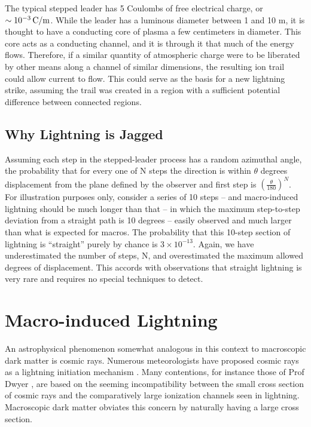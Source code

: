 \documentclass[%
 reprint,
 amsmath,amssymb,
 aps,
]{revtex4-2}
\begin{document}
    The typical stepped leader has 5 Coulombs of free electrical charge, or $\sim10^{-3} \, \rm{C/m}$. While the leader has a luminous diameter between 1 and 10 m, it is thought to have a conducting core of plasma a few centimeters in diameter. This core acts as a conducting channel, and it is through it that much of the energy flows. Therefore, if a similar quantity of atmospheric charge were to be liberated by other means along a channel of similar dimensions, the resulting ion trail could allow current to flow. This could serve as the basis for a new lightning strike, assuming the trail was created in a region with a sufficient potential difference between connected regions.
    
    
    \subsection*{Why Lightning is Jagged} %
    \label{sub:why_lightning_is_jagged}

        Assuming each step in the stepped-leader process has a random azimuthal angle, the probability that for every one of N steps the direction is within $\theta$ degrees displacement from the plane defined by the observer and first step is $\left(\frac{\theta}{180}\right)^{N}$. For illustration purposes only, consider a series of 10 steps  -- and macro-induced lightning should be much longer than that -- in which the maximum step-to-step deviation from a straight path is 10 degrees -- easily observed and much larger than what is expected for macros.
        The probability that this 10-step section of lightning is ``straight'' purely by chance is $3 \times 10^{-13}$. Again, we have underestimated the number of steps, N, and overestimated the maximum allowed degrees of displacement. This accords with observations that straight lightning is very rare and requires no special techniques to detect.
        



\section{Macro-induced \textbf{}Lightning} %
\label{sec:macro_induced_lightning}

    An astrophysical phenomenon somewhat analogous in this context to macroscopic dark matter is cosmic rays. Numerous meteorologists have proposed cosmic rays as a lightning initiation mechanism \citep{Babich2012}. Many contentions, for instance those of Prof Dwyer \citep{scientific_american_2008}, are based on the seeming incompatibility between the small cross section of cosmic rays and the comparatively large ionization channels seen in lightning. Macroscopic dark matter obviates this concern by naturally having a large cross section.
\end{document}
